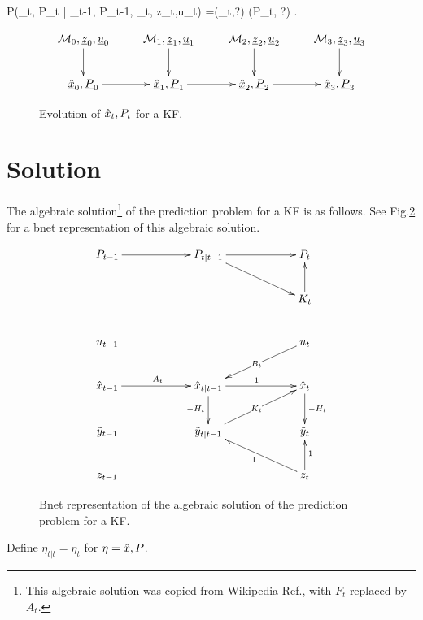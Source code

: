 \beq \color{blue}
P(\hatx_t, P_t | 
\hatx_{t-1}, P_{t-1},
\calm_t,
z_t,u_t)
=\delta(\hatx_t,?)
\delta(P_t, ?)
\;.
\eeq

\begin{figure}[h!]
\centering
$$\xymatrix{
\calm_0, \rvz_0,\rvu_0\ar[d]&
\calm_1, \rvz_1,\rvu_1\ar[d]&
\calm_2, \rvz_2,\rvu_2\ar[d]&
\calm_3, \rvz_3,\rvu_3\ar[d]
\\
\ul{\hatx}_0, 
\ul{P}_0\ar[r]&
\ul{\hatx}_1, 
\ul{P}_1\ar[r]&
\ul{\hatx}_2, 
\ul{P}_2\ar[r]&
\ul{\hatx}_3, 
\ul{P}_3
}$$
\caption{Evolution of
${\hat{x}}_t, P_t$ for a KF.}
\label{fig-kal-evol}
\end{figure}

\section{
Solution} 

The algebraic solution\footnote{This
algebraic
 solution was copied from 
Wikipedia Ref.\cite{wiki-kalman},
with $F_t$ replaced by $A_t$.}
of
the prediction problem
for a KF 
is as follows.
See Fig.\ref{fig-kal-evol-plus}
for a bnet representation
of this algebraic
solution.

\begin{figure}[h!]
$$
\xymatrix@C=5pc{
P_{t-1}\ar[r]
&P_{t|t-1}\ar[r]\ar[rd]
&P_t
\\
&&
K_t\ar[u]
\\
u_{t-1}
&
&u_t\ar[ld]|{B_t}
\\
\hatx_{t-1}\ar[r]^{A_t}
&\hatx_{t|t-1}\ar[r]^1
\ar[d]_{-H_t}
&\hatx_t\ar[d]^{-H_t}
\\
\tilde{y}_{t-1}
&\tilde{y}_{t|t-1}\ar[ru]|{K_t}
&\tilde{y}_t
\\
z_{t-1}
&
&z_t\ar[lu]^1
\ar[u]_1
}
$$
\caption{Bnet representation
of the algebraic
solution of
the prediction 
problem for a KF.}
\label{fig-kal-evol-plus}
\end{figure}


Define $\eta_{t|t}=\eta_t$ for 
$\eta={\hat{x}}, P$.

